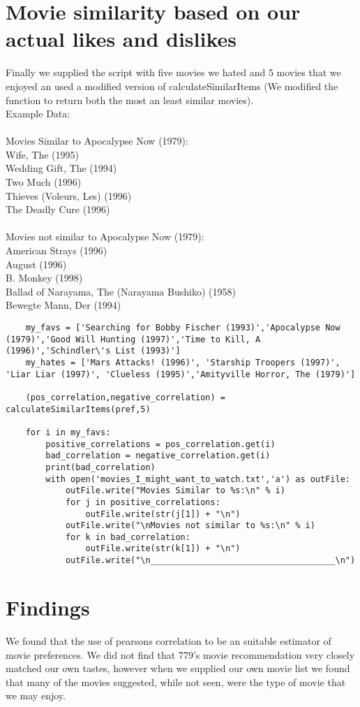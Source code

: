\documentclass[11pt]{article}
\begin{document}
	\section{Movie similarity based on our actual likes and dislikes}
	\hspace{10mm} Finally we supplied the script with five movies we hated and 5 movies that we enjoyed an used a modified version of calculateSimilarItems  (We modified the function to return both the most an least similar movies).  \\
	Example Data: \\ \\
	Movies Similar to Apocalypse Now (1979): \\
	Wife, The (1995) \\
	Wedding Gift, The (1994) \\
	Two Much (1996) \\
	Thieves (Voleurs, Les) (1996) \\
	The Deadly Cure (1996) \\
	\\
	Movies not similar to Apocalypse Now (1979): \\
	American Strays (1996) \\
	August (1996) \\
	B. Monkey (1998) \\
	Ballad of Narayama, The (Narayama Bushiko) (1958) \\
	Bewegte Mann, Der (1994) \\
	\begin{lstlisting}
	my_favs = ['Searching for Bobby Fischer (1993)','Apocalypse Now (1979)','Good Will Hunting (1997)','Time to Kill, A (1996)','Schindler\'s List (1993)']
	my_hates = ['Mars Attacks! (1996)', 'Starship Troopers (1997)', 'Liar Liar (1997)', 'Clueless (1995)','Amityville Horror, The (1979)']
	
	(pos_correlation,negative_correlation) = calculateSimilarItems(pref,5)
	
	for i in my_favs:
	    positive_correlations = pos_correlation.get(i)
	    bad_correlation = negative_correlation.get(i)
	    print(bad_correlation)
	    with open('movies_I_might_want_to_watch.txt','a') as outFile:
	        outFile.write("Movies Similar to %s:\n" % i)
	        for j in positive_correlations:
	            outFile.write(str(j[1]) + "\n")
	        outFile.write("\nMovies not similar to %s:\n" % i)
	        for k in bad_correlation:
	            outFile.write(str(k[1]) + "\n")
	        outFile.write("\n_____________________________________\n")
	\end{lstlisting}
	\section{Findings}
	We found that the use of pearsons correlation to be an suitable estimator of movie preferences. We did not find that 779's movie recommendation very closely matched our own tastes, however when we supplied our own movie list we found that many of the movies suggested, while not seen, were the type of movie that we may enjoy. 
	

	
\end{document}
